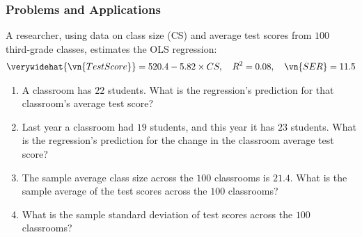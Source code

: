 

\begin{frame}
\frametitle{Problems and Applications}
A researcher, using data on class size (CS) and average test scores from $100$ third-grade classes, estimates the OLS regression:
\begin{align*}\vspace*{-2ex}
\verywidehat{\vn{TestScore}} 
  = 520.4 - 5.82 \times CS,
  \quad R^2 = 0.08,
  \quad \vn{SER} = 11.5
\end{align*}
\vspace*{-2ex}
\begin{enumerate}
\item A classroom has $22$ students. What is the regression's prediction for that classroom's average test score?
\item Last year a classroom had $19$ students, and this year it has $23$ students. What is the regression's prediction for the change in the classroom average test score?
\item The sample average class size across the $100$ classrooms is $21.4$. What is the sample average of the test scores across the $100$ classrooms?
\item What is the sample standard deviation of test scores across the $100$ classrooms?
\end{enumerate}
\end{frame}

